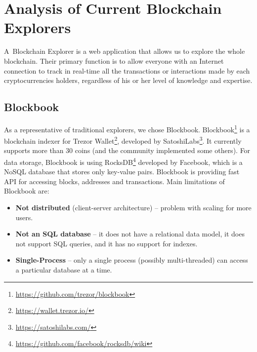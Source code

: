 \section{Analysis of Current Blockchain Explorers}
A~Blockchain Explorer is a web application that allows us to explore the whole blockchain. Their primary function is to allow everyone with an Internet connection to track in real-time all the transactions or interactions made by each cryptocurrencies holders, regardless of his or her level of knowledge and expertise. \cite{laurence2019blockchain, dhillon2017blockchain}


\subsection{Blockbook}
As a representative of traditional explorers, we chose Blockbook. Blockbook\footnote{\url{https://github.com/trezor/blockbook}} is a blockchain indexer for Trezor Wallet\footnote{\url{https://wallet.trezor.io/}}, developed by SatoshiLabs\footnote{\url{https://satoshilabs.com/}}. It currently supports more than 30 coins (and the community implemented some others). For data storage, Blockbook is using RocksDB\footnote{\url{https://github.com/facebook/rocksdb/wiki}} developed by Facebook, which is a NoSQL database that stores only key-value pairs. Blockbook is providing fast API for accessing blocks, addresses and transactions. Main limitations of Blockbook are:
\begin{itemize}
    \item \textbf{Not distributed} (client-server architecture) -- problem with scaling for more users. 
    \item \textbf{Not an SQL database} -- it does not have a relational data model, it does not support SQL queries, and it has no support for indexes.
    \item \textbf{Single-Process} -- only a single process (possibly multi-threaded) can access a particular database at a time.
\end{itemize}